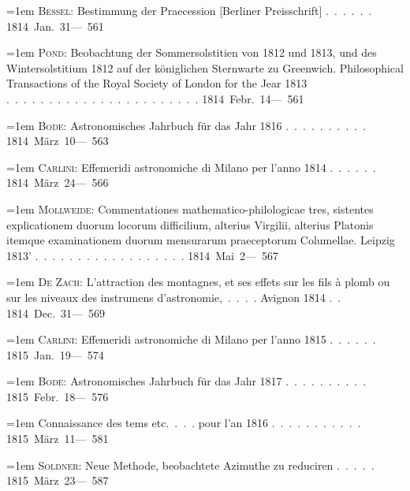 \noindent\hangindent=1em \textsc{Bessel}: Bestimmung der Praecession [Berliner Preisschrift] \mbox{.\ .\ .\ .\ .\ .} \hfill\mbox{1814 Jan. 31}\quad\mbox{--- 561}\par\smallskip
\noindent\hangindent=1em \textsc{Pond}: Beobachtung der Sommersolstitien von 1812 und 1813, und des Wintersolstitium 1812 auf der königlichen Sternwarte zu Greenwich. Philosophical Transactions of the Royal Society of London for the Jear 1813 \mbox{.\ .\ .\ .\ .\ .\ .\ .\ .\ .\ .\ .\ .\ .\ .\ .\ .\ .\ .\ .\ .\ .\ .} \hfill\mbox{1814 Febr. 14}\quad\mbox{--- 561}\par\smallskip
\noindent\hangindent=1em \textsc{Bode}: Astronomisches Jahrbuch für das Jahr 1816 \mbox{.\ .\ .\ .\ .\ .\ .\ .\ .\ .} \hfill\mbox{1814 März 10}\quad\mbox{--- 563}\par\smallskip
\noindent\hangindent=1em \textsc{Carlini}: Effemeridi astronomiche di Milano per l'anno 1814 \mbox{.\ .\ .\ .\ .\ .} \hfill\mbox{1814 März 24}\quad\mbox{--- 566}\par\smallskip
\noindent\hangindent=1em \textsc{Mollweide}: Commentationes mathematico-philologicae tres, sistentes explicationem duorum locorum difficilium, alterius Virgilii, alterius Platonis itemque examinationem duorum mensurarum praeceptorum Columellae. Leipzig 1813' \mbox{.\ .\ .\ .\ .\ .\ .\ .\ .\ .\ .\ .\ .\ .\ .\ .\ .\ .} \hfill\mbox{1814 Mai 2}\quad\mbox{--- 567}\par\smallskip
\noindent\hangindent=1em \textsc{De Zach}: L'attraction des montagnes, et ses effets sur les fils à plomb ou sur les niveaux des instrumens d'astronomie,\ .\ .\ .\ . Avignon 1814 \mbox{.\ .} \hfill\mbox{1814 Dec. 31}\quad\mbox{--- 569}\par\smallskip
\noindent\hangindent=1em \textsc{Carlini}: Effemeridi astronomiche di Milano per l'anno 1815 \mbox{.\ .\ .\ .\ .\ .} \hfill\mbox{1815 Jan. 19}\quad\mbox{--- 574}\par\smallskip
\noindent\hangindent=1em \textsc{Bode}: Astronomisches Jahrbuch für das Jahr 1817 \mbox{.\ .\ .\ .\ .\ .\ .\ .\ .\ .} \hfill\mbox{1815 Febr. 18}\quad\mbox{--- 576}\par\smallskip
\noindent\hangindent=1em Connaissance des tems etc.\ .\ .\ . pour l'an 1816 \mbox{.\ .\ .\ .\ .\ .\ .\ .\ .\ .\ .} \hfill\mbox{1815 März 11}\quad\mbox{--- 581}\par\smallskip
\noindent\hangindent=1em \textsc{Soldner}: Neue Methode, beobachtete Azimuthe zu reduciren \mbox{.\ .\ .\ .\ .} \hfill\mbox{1815 März 23}\quad\mbox{--- 587}\par\smallskip
